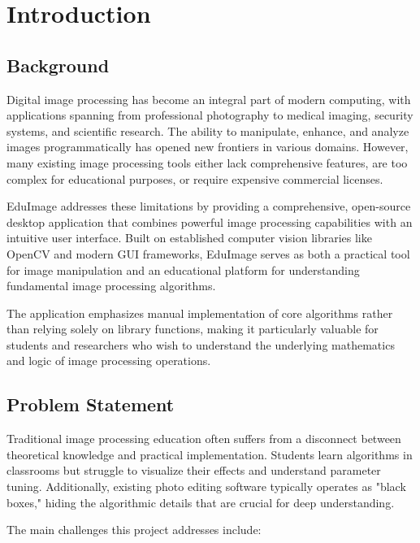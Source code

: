 \documentclass[12pt,a4paper]{article}
\begin{document}
\tableofcontents
\newpage

\section{Introduction}

\subsection{Background}

Digital image processing has become an integral part of modern computing, with applications spanning from professional photography to medical imaging, security systems, and scientific research. The ability to manipulate, enhance, and analyze images programmatically has opened new frontiers in various domains. However, many existing image processing tools either lack comprehensive features, are too complex for educational purposes, or require expensive commercial licenses.

EduImage addresses these limitations by providing a comprehensive, open-source desktop application that combines powerful image processing capabilities with an intuitive user interface. Built on established computer vision libraries like OpenCV and modern GUI frameworks, EduImage serves as both a practical tool for image manipulation and an educational platform for understanding fundamental image processing algorithms.

The application emphasizes manual implementation of core algorithms rather than relying solely on library functions, making it particularly valuable for students and researchers who wish to understand the underlying mathematics and logic of image processing operations.

\subsection{Problem Statement}

Traditional image processing education often suffers from a disconnect between theoretical knowledge and practical implementation. Students learn algorithms in classrooms but struggle to visualize their effects and understand parameter tuning. Additionally, existing photo editing software typically operates as "black boxes," hiding the algorithmic details that are crucial for deep understanding.

The main challenges this project addresses include:
\end{document}
